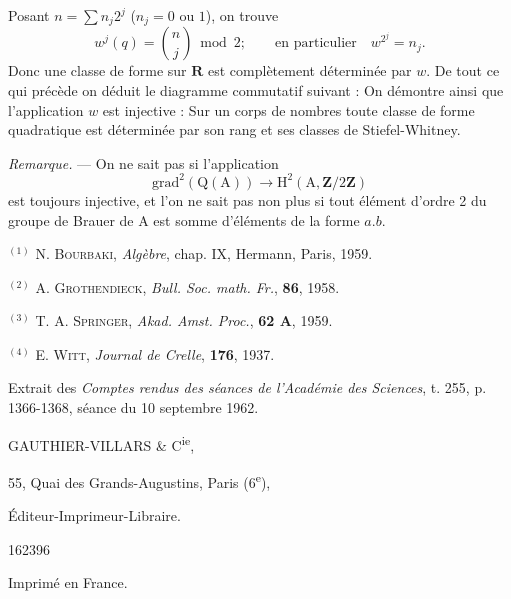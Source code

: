 Posant $n=\sum n_j2^j$ ($n_j=0$ ou $1$), on trouve
\[
w^j(q)=\binom nj\bmod 2;\qquad\text{en particulier}\quad w^{2^j}=n_j.
\]
Donc une classe de forme sur $\mathbf R$ est complètement déterminée par $w$.
De tout ce qui précède on déduit le diagramme commutatif suivant :
On démontre ainsi que l'application $w$ est injective : Sur un corps de
nombres toute classe de forme quadratique est déterminée par son rang et ses
classes de Stiefel-Whitney.

\textit{Remarque.} --- On ne sait pas si l'application
\[
\mathrm{grad}^2(\mathrm Q(\mathrm A))\to\mathrm H^2(\mathrm A,\mathbf Z/2\mathbf Z)
\]
est toujours injective, et l'on ne sait pas non plus si tout élément d'ordre 2
du groupe de Brauer de $\mathrm A$ est somme d'éléments de la forme $a.b$.

$^{(1)}$ N. \textsc{Bourbaki}, \textit{Algèbre}, chap. IX, Hermann, Paris, 1959.

$^{(2)}$ A. \textsc{Grothendieck}, \textit{Bull. Soc. math. Fr.}, \textbf{86}, 1958.

$^{(3)}$ T. A. \textsc{Springer}, \textit{Akad. Amst. Proc.}, \textbf{62 A}, 1959.

$^{(4)}$ E. \textsc{Witt}, \textit{Journal de Crelle}, \textbf{176}, 1937.

Extrait des \textit{Comptes rendus des séances de l'Académie des Sciences},
t. 255, p. 1366-1368, séance du 10 septembre 1962.

GAUTHIER-VILLARS \& C\textsuperscript{ie},

55, Quai des Grands-Augustins, Paris (6\textsuperscript{e}),

Éditeur-Imprimeur-Libraire.

162396

Imprimé en France.


